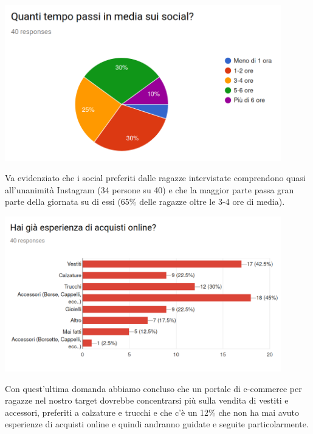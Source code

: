 \documentclass[12pt,a4paper]{report}
\begin{document}
\begin{flushleft}
  \includegraphics[width=0.9\textwidth]{"Images Latex/Grafici Sondaggi/6 - Tempo medio Social"}
\end{flushleft}
Va evidenziato che i social preferiti dalle ragazze intervistate comprendono quasi all'unanimità Instagram (34 persone su 40) e che la maggior parte passa gran parte della giornata su di essi (65\% delle ragazze oltre le 3-4 ore di media).
\begin{flushleft}
  \includegraphics[width=0.9\textwidth]{"Images Latex/Grafici Sondaggi/7 - Esperienza acquisti online"}
\end{flushleft}
Con quest'ultima domanda abbiamo concluso che un portale di e-commerce per ragazze nel nostro target dovrebbe concentrarsi più sulla vendita di vestiti e accessori, preferiti a calzature e trucchi e che c'è un 12\% che non ha mai avuto esperienze di acquisti online e quindi andranno guidate e seguite particolarmente.
\newpage
\end{document}
